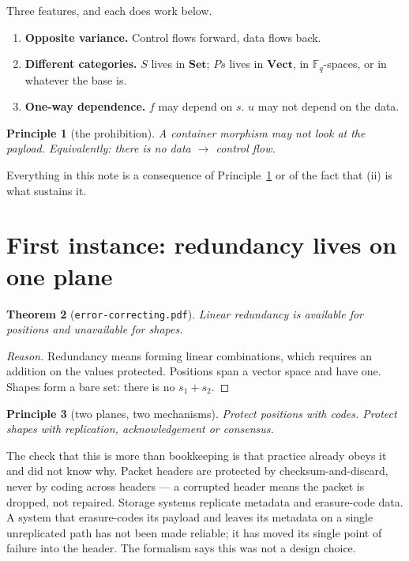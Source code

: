 \documentclass[11pt,a4paper]{article}
\newtheorem{theorem}{Theorem}[section]
\newtheorem{principle}[theorem]{Principle}
\theoremstyle{definition}
\theoremstyle{remark}
\newcommand{\FF}{\mathbb{F}}
\newcommand{\cat}[1]{\mathbf{#1}}
\newcommand{\Set}{\cat{Set}}
\newcommand{\Vect}{\cat{Vect}}
\begin{document}
Three features, and each does work below.

\begin{enumerate}[nosep,label=(\roman*)]
\item \textbf{Opposite variance.} Control flows forward, data flows back.
\item \textbf{Different categories.} $S$ lives in $\Set$; $P s$ lives in $\Vect$,
      in $\FF_q$-spaces, or in whatever the base is.
\item \textbf{One-way dependence.} $f$ may depend on $s$. $u$ may not depend on
      the data.
\end{enumerate}

\begin{principle}[the prohibition]\label{prin:prohibit}
A container morphism may not look at the payload. Equivalently: there is no
data $\to$ control flow.
\end{principle}

Everything in this note is a consequence of Principle~\ref{prin:prohibit} or of
the fact that (ii) is what sustains it.

\section{First instance: redundancy lives on one plane}

\begin{theorem}[\texttt{error-correcting.pdf}]\label{thm:code}
Linear redundancy is available for positions and unavailable for shapes.
\end{theorem}

\begin{proof}[Reason]
Redundancy means forming linear combinations, which requires an addition on the
values protected. Positions span a vector space and have one. Shapes form a bare
set: there is no $s_1 + s_2$.
\end{proof}

\begin{principle}[two planes, two mechanisms]
Protect positions with codes. Protect shapes with replication, acknowledgement or
consensus.
\end{principle}

The check that this is more than bookkeeping is that practice already obeys it and
did not know why. Packet headers are protected by checksum-and-discard, never by
coding across headers --- a corrupted header means the packet is dropped, not
repaired. Storage systems replicate metadata and erasure-code data. A system that
erasure-codes its payload and leaves its metadata on a single unreplicated path
has not been made reliable; it has moved its single point of failure into the
header. The formalism says this was not a design choice.
\end{document}
